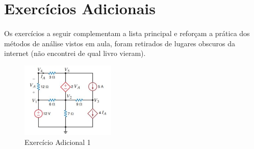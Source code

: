 \newpage
\section{Exercícios Adicionais}

\paragraph{}
Os exercícios a seguir complementam a lista principal e reforçam a prática dos
métodos de análise vistos em aula, foram retirados de lugares obscuros da
internet (não encontrei de qual livro vieram).

\begin{figure}[H]
  \centering
  \includegraphics[width=0.4\textwidth]{./fig/figP3.5.png}
  \caption{Exercício Adicional 1}\label{fig:figP3.5}
\end{figure}
\answer{
}
